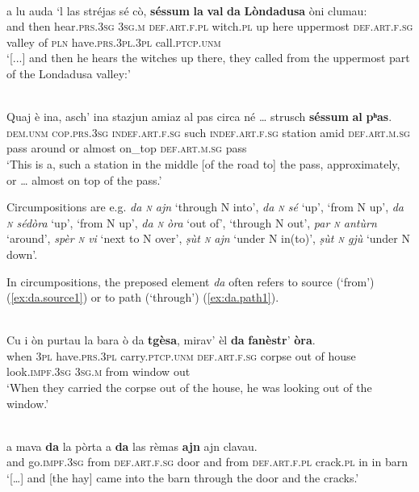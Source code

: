 \ea
\label{}
\\
\gll    [...] a lu auda `l las stréjas sé cò, \textbf{séssum} \textbf{la} \textbf{val} \textbf{da} \textbf{Lòndadusa} òni clumau:\\
{} and then hear.\textsc{prs.3sg} \textsc{3sg.m} \textsc{def.art.f.pl} witch.\textsc{pl} up here uppermost \textsc{def.art.f.sg} valley of \textsc{pln} have.\textsc{prs.3pl.3pl} call.\textsc{ptcp.unm}\\
\glt `[...] and then he hears the witches up there, they called from the uppermost part of the Londadusa valley:'
\z

\ea
\label{}
\\
\gll Quaj è ina, asch’ ina stazjun amiaz al pas circa né … strusch \textbf{séssum} \textbf{al} \textbf{pʰas}.   \\
\textsc{dem.unm} \textsc{cop.prs.3sg} \textsc{indef.art.f.sg} such \textsc{indef.art.f.sg} station amid \textsc{def.art.m.sg} pass around or {} almost on\_top \textsc{def.art.m.sg} pass\\
\glt `This is a, such a station in the middle [of the road to] the pass, approximately, or … almost on top of the pass.'
\z


Circumpositions are e.g. \textit{da \textsc{n} ajn} `through N into', \textit{da \textsc{n} sé} `up', `from N up', \textit{da \textsc{n} sédòra} `up', `from N up', \textit{da \textsc{n} òra} `out of', `through N out', \textit{par \textsc{n} antùrn} `around', \textit{spèr \textsc{n} vi} `next to N over', \textit{ṣùt \textsc{n} ajn} `under N in(to)', \textit{ṣùt \textsc{n} gjù} `under N down'.

In circumpositions, the preposed element \textit{da} often refers to source (`from') (\ref{ex:da.source1}) or to path (`through') (\ref{ex:da.path1}).

\ea
\label{ex:da.source1}
\\
\gll Cu i òn purtau la bara ò da \textbf{tgèsa}, mirav’ èl \textbf{da} \textbf{fanèstr}’ \textbf{òra}.\\
when \textsc{3pl} have.\textsc{prs.3pl} carry.\textsc{ptcp.unm} \textsc{def.art.f.sg} corpse out of house
look.\textsc{impf.3sg} \textsc{3sg.m} from window out\\
\glt `When they carried the corpse out of the house, he was looking out of the window.'
\z


\ea
\label{ex:da.path1}
\\
\gll […] a mava \textbf{da} la pòrta a \textbf{da} las rèmas \textbf{ajn} ajn clavau.\\
[…] and go.\textsc{impf.3sg} from \textsc{def.art.f.sg} door and from \textsc{def.art.f.pl} crack.\textsc{pl} in in barn \\
\glt `[…] and [the hay] came into the barn through the door and the cracks.'
\z

